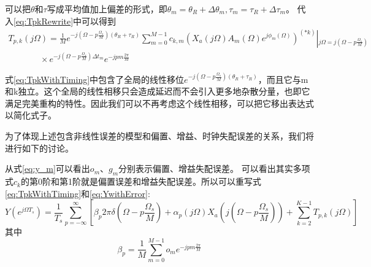 		可以把$\theta $和$\tau $写成平均值加上偏差的形式，即${\theta _m} = {\theta _R} + \Delta {\theta _m},{\tau _m} = {\tau _R} + \Delta {\tau _m}$。
		代入\ref{eq:TpkRewrite}中可以得到
		 \begin{equation}
			\begin{array}{ccccc}
			{T_{p,k}}\left( {j\Omega } \right) = \frac{1}{M}{e^{ - j\left( {\Omega  - p\frac{{{\Omega _s}}}{M}} \right)\left( {{\theta _R} + {\tau _R}} \right)}}\sum\limits_{m = 0}^{M - 1} {{c_{k,m}}} {\left( {{X_a}\left( {j\Omega } \right){A_m}\left( \Omega  \right){e^{j{\phi _m}\left( \Omega  \right)}}} \right)^{\left( {*k} \right)}}\left| {_{j\Omega  = j\left( {\Omega  - p\frac{{{\Omega _s}}}{M}} \right)}} \right.\\
			\,\,\,\,\,\,\,\,\,\,\,\,\,\,\,\,\,\,\,\,\,\, \times {e^{ - j\left( {\Omega  - p\frac{{{\Omega _s}}}{M}} \right)\Delta {t_m}}}{e^{ - jpm\frac{{2\pi }}{M}}}
			\end{array}\label{eq:TpkWithTiming}
		\end{equation}
		
		式\ref{eq:TpkWithTiming}中包含了全局的线性移位${e^{ - j\left( {\Omega  - p\frac{{{\Omega _s}}}{M}} \right)\left( {{\theta _R} + {\tau _R}} \right)}}$，而且它与m和k独立。这个全局的线性相移只会造成延迟而不会引入更多地杂散分量，也即它满足完美重构的特性。因此我们可以不再考虑这个线性相移，可以把它移出表达式以简化式子。\par
		为了体现上述包含非线性误差的模型和偏置、增益、时钟失配误差的关系，我们将进行如下的讨论。\par
		从式\ref{eq:y_m}可以看出$o_m$、$g_m$分别表示偏置、增益失配误差。
		可以看出其实多项式$c_k$的第0阶和第1阶就是偏置误差和增益失配误差。所以可以重写式\ref{eq:TpkWithTiming}和\ref{eq:YwithError}:
		 \begin{equation}
			Y\left( {{e^{j\Omega {T_s}}}} \right) = \frac{1}{{{T_s}}}\sum\limits_{p =  - \infty }^\infty  {\left[ {{\beta _p}2\pi \delta \left( {\Omega  - p\frac{{{\Omega _s}}}{M}} \right) + {\alpha _p}\left( {j\Omega } \right){X_a}\left( {j\left( {\Omega  - p\frac{{{\Omega _s}}}{M}} \right)} \right) + \sum\limits_{k = 2}^{K - 1} {{T_{p,k}}\left( {j\Omega } \right)} } \right]} \label{eq:YwithGainOffset}
		\end{equation}
		其中
		\begin{equation}
			{\beta _p} = \frac{1}{M}\sum\limits_{m = 0}^{M - 1} {{o_m}{e^{ - jpm\frac{{2\pi }}{M}}}} 
		\end{equation}
		
